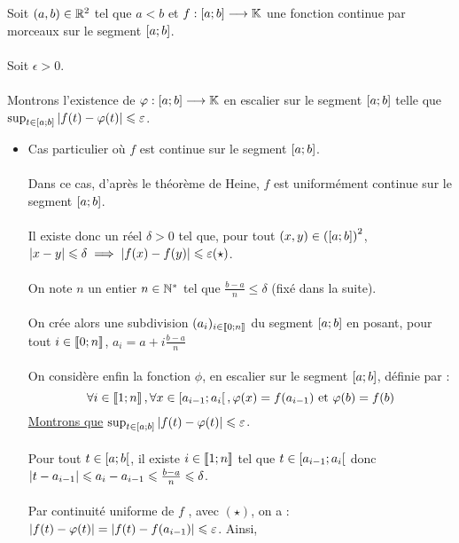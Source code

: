 \begin{dem}
    Soit \((a, b) \in \mathbb{R}^2\) tel que \(a < b\) et \(f : \left[a;b\right] \longrightarrow \mathbb{K}\) une fonction continue par morceaux sur le segment \(\left[a;b\right]\).\\~\\
    Soit \(\epsilon > 0\).\\~\\
    Montrons l’existence de \(\varphi : \left[a;b\right] \longrightarrow \mathbb{K}\) en escalier sur le segment \(\left[a;b\right]\) telle que \(\sup_{t\in\left[a;b\right]}\left\lvert f (t) - \varphi(t)\right\rvert \leqslant \varepsilon\).
    \begin{itemize}
    \item Cas particulier où \(f\) est continue sur le segment \(\left[a;b\right]\).\\~\\
        Dans ce cas, d’après le théorème de Heine, \(f\) est uniformément continue sur le segment \(\left[a;b\right]\).\\~\\
        Il existe donc un réel \(\delta > 0\) tel que, pour tout \((x, y) \in \left(\left[a;b\right]\right)^2\), \(\abs{x - y} \leq \delta \imp \abs{f (x) - f (y)} \leq \epsilon \hfill (\star)\).\\~\\
        On note \(n\) un entier \(n \in \mathbb{N}^*\) tel que \(\frac{b - a}{n} \leq \delta\) (fixé dans la suite).\\~\\
        On crée alors une subdivision \((a_i)_{i\in\left\llbracket0;n\right\rrbracket}\) du segment \(\left[a;b\right]\) en posant, pour tout \(i \in \left\llbracket0;n\right\rrbracket\), \(a_i = a + i\frac{b - a}{n}\)\\~\\
        On considère enfin la fonction \(\phi\), en escalier sur le segment \(\left[a;b\right]\), définie par :
        \[\forall i \in \left\llbracket1;n\right\rrbracket, \forall x \in \left[a_{i-1};a_i\right[ , \varphi(x) = f (a_{i-1}) \text{ et } \varphi(b) = f (b)\]
        \underline{Montrons que} \(\sup_{t\in\left[a;b\right]} \left\lvert f (t) - \varphi(t)\right\rvert \leqslant \varepsilon\).\\~\\
        Pour tout \(t \in \left[a;b\right[\), il existe \(i \in \left\llbracket1;n\right\rrbracket\) tel que \(t \in \left[a_{i-1};a_i\right[\) donc \(\left\lvert t - a_{i-1}\right\rvert \leqslant a_i - a_{i-1} \leqslant \frac{b - a}{n} \leqslant \delta\).\\~\\
        Par continuité uniforme de \(f\) , avec \((\star)\), on a : \(\left\lvert f (t) - \varphi(t)\right\rvert = \left\lvert f (t) - f (a_{i-1})\right\rvert \leqslant \varepsilon\). Ainsi,

\end{itemize}
\end{dem}
